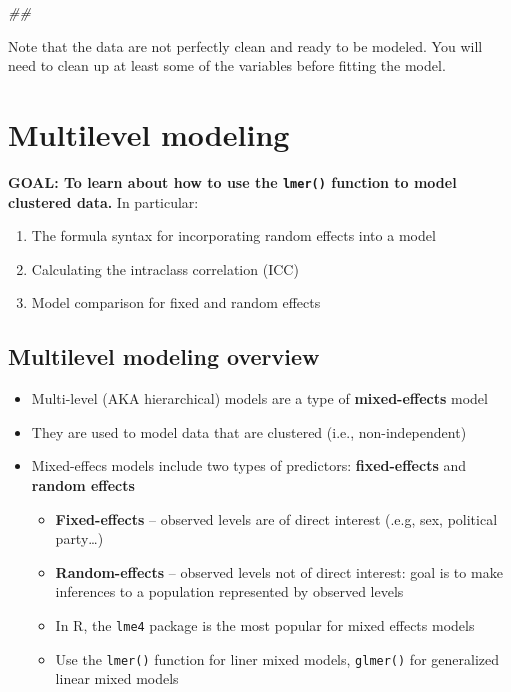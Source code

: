 \documentclass[
]{book}
\newenvironment{Shaded}{\begin{snugshade}}{\end{snugshade}}
\newcommand{\CommentTok}[1]{\textcolor[rgb]{0.56,0.35,0.01}{\textit{#1}}}
\providecommand{\tightlist}{%
  \setlength{\itemsep}{0pt}\setlength{\parskip}{0pt}}
\begin{document}
\begin{Shaded}
\begin{Highlighting}[]
\CommentTok{## }
\end{Highlighting}
\end{Shaded}

Note that the data are not perfectly clean and ready to be modeled. You will need to clean up at least some of the variables before fitting the model.

\hypertarget{multilevel-modeling}{%
\section{Multilevel modeling}\label{multilevel-modeling}}

\textbf{GOAL: To learn about how to use the \texttt{lmer()} function to model clustered data.} In particular:

\begin{enumerate}
\def\labelenumi{\arabic{enumi}.}
\tightlist
\item
  The formula syntax for incorporating random effects into a model
\item
  Calculating the intraclass correlation (ICC)
\item
  Model comparison for fixed and random effects
\end{enumerate}

\hypertarget{multilevel-modeling-overview}{%
\subsection{Multilevel modeling overview}\label{multilevel-modeling-overview}}

\begin{itemize}
\tightlist
\item
  Multi-level (AKA hierarchical) models are a type of \textbf{mixed-effects} model
\item
  They are used to model data that are clustered (i.e., non-independent)
\item
  Mixed-effecs models include two types of predictors: \textbf{fixed-effects} and \textbf{random effects}

  \begin{itemize}
  \tightlist
  \item
    \textbf{Fixed-effects} -- observed levels are of direct interest (.e.g, sex, political party\ldots)
  \item
    \textbf{Random-effects} -- observed levels not of direct interest: goal is to make inferences to a population represented by observed levels
  \item
    In R, the \texttt{lme4} package is the most popular for mixed effects models
  \item
    Use the \texttt{lmer()} function for liner mixed models, \texttt{glmer()} for generalized linear mixed models
  \end{itemize}
\end{itemize}
\end{document}
